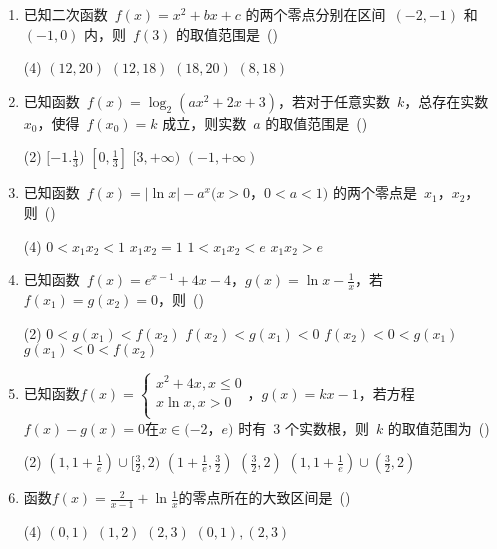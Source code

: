 \documentclass[UTF8,twoside,openright]{ctexbook}
\newcommand{\hfquan}[1]{\raisebox{-0.05em}{\koz\CIDtextblackboxed{#1}}}
\newenvironment{zuoye}{
\begin{enumerate}
[
labelindent=0mm,
align=left,
labelwidth=1.5em,
itemsep=2em,
labelsep=0em,
leftmargin=1.5em,
label={\textcolor{cyan}{\hfquan{\arabic*}}}]
}
{\end{enumerate}}
\begin{document}
\begin{zuoye}
\item 已知二次函数~$f(x)=x^{2}+bx+c$ 的两个零点分别在区间~$(-2,-1)$ 和~$(-1,0)$ 内，则~$f(3)$ 的取值范围是~(\quad)
\begin{tasks}(4)
    \task $(12,20)$ \task $(12,18)$ \task $(18,20)$ \task $(8,18)$
\end{tasks}

\item 已知函数~$f(x)=\log_{2}(ax^{2}+2x+3)$，若对于任意实数~$k$，总存在实数~$x_{0} $，使得~$f(x_{0}
)=k$ 成立，则实数~$a$ 的取值范围是~(\quad)
\begin{tasks}(2)
    \task $[-1.\frac{1}{3})$ \task $[0,\frac{1}{3}]$
    \task $[3,+\infty )$ \task $(-1,+\infty)$
\end{tasks}

\item 已知函数~$f(x)=|\ln x|-a^{x}(x>0$，$0<a<1)$ 的两个零点是~$x_{1} $，$x_{2}
$，则~(\quad)
\begin{tasks}(4)
    \task $0<x_{1} x_{2} <1$ \task $x_{1} x_{2} =1$
    \task $1<x_{1} x_{2} <e$ \task $x_{1}x_{2} >e$
\end{tasks}


\item 已知函数~$f(x)=e^{x-1}+4x-4$，$g(x)=\ln x-\frac{1}{x}$，若~$f(x_{1}
)=g(x_{2} )=0$，则~(\quad)
\begin{tasks}(2)
    \task $0<g(x_{1} )<f(x_{2} )$ \task $f(x_{2} )<g(x_{1} )<0$
    \task $f(x_{2} )<0<g(x_{1} )$ \task $g(x_{1} )<0<f(x_{2} )$
\end{tasks}

\item 已知函数$f(x)=
\begin{cases}
{x^{2}+4x,x\leq 0} \\
 {x\ln x,x>0} \\
\end{cases}
$，$g(x)=kx-1$，若方程~$f(x)-g(x)=0$在$x\in
(-$2，$e)$ 时有~3 个实数根，则~$k$ 的取值范围为~(\quad)
\begin{tasks}(2)
    \task $(1,1+\frac{1}{e})\cup [\frac{3}{2},2) $
    \task $(1+\frac{1}{e},\frac{3}{2}) $
    \task $(\frac{3}{2},2) $
    \task $(1,1+\frac{1}{e})\cup (\frac{3}{2},2)$
\end{tasks}

\item 函数$f(x)=\frac{2}{x-1}+\ln \frac{1}{x}$的零点所在的大致区间是~(\quad)
\begin{tasks}(4)
    \task $(0, 1) $ \task $ (1, 2)$
    \task $(2, 3) $ \task $(0, 1),(2, 3) $
\end{tasks}


\end{zuoye}
\end{document}
